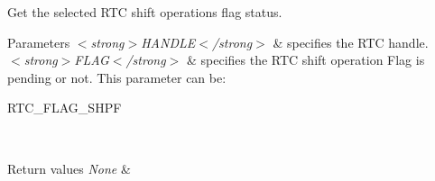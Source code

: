 Get the selected R\+TC shift operation\textquotesingle{}s flag status. 


\begin{DoxyParams}{Parameters}
{\em $<$strong$>$\+H\+A\+N\+D\+L\+E$<$/strong$>$} & specifies the R\+TC handle. \\
\hline
{\em $<$strong$>$\+F\+L\+A\+G$<$/strong$>$} & specifies the R\+TC shift operation Flag is pending or not. This parameter can be\+: \begin{DoxyItemize}
\item R\+T\+C\+\_\+\+F\+L\+A\+G\+\_\+\+S\+H\+PF \end{DoxyItemize}
\\
\hline
\end{DoxyParams}

\begin{DoxyRetVals}{Return values}
{\em None} & \\
\hline
\end{DoxyRetVals}
